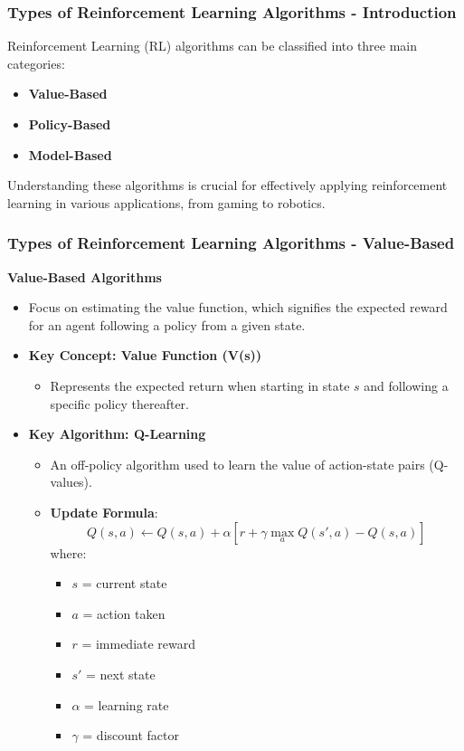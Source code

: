 \documentclass[aspectratio=169]{beamer}
\begin{document}
\begin{frame}[fragile]
    \frametitle{Types of Reinforcement Learning Algorithms - Introduction}
    Reinforcement Learning (RL) algorithms can be classified into three main categories:
    \begin{itemize}
        \item \textbf{Value-Based}
        \item \textbf{Policy-Based}
        \item \textbf{Model-Based}
    \end{itemize}
    Understanding these algorithms is crucial for effectively applying reinforcement learning in various applications, from gaming to robotics.
\end{frame}

\begin{frame}[fragile]
    \frametitle{Types of Reinforcement Learning Algorithms - Value-Based}
    \textbf{Value-Based Algorithms}
    \begin{itemize}
        \item Focus on estimating the value function, which signifies the expected reward for an agent following a policy from a given state.
        \item \textbf{Key Concept: Value Function (V(s))} 
        \begin{itemize}
            \item Represents the expected return when starting in state $s$ and following a specific policy thereafter.
        \end{itemize}
        \item \textbf{Key Algorithm: Q-Learning}
        \begin{itemize}
            \item An off-policy algorithm used to learn the value of action-state pairs (Q-values).
            \item \textbf{Update Formula}:
            \begin{equation}
                Q(s, a) \leftarrow Q(s, a) + \alpha \left[ r + \gamma \max_a Q(s', a) - Q(s, a) \right]
            \end{equation}
            where:
            \begin{itemize}
                \item $s$ = current state
                \item $a$ = action taken
                \item $r$ = immediate reward
                \item $s'$ = next state
                \item $\alpha$ = learning rate
                \item $\gamma$ = discount factor
            \end{itemize}
        \end{itemize}
    \end{itemize}
\end{frame}
\end{document}
